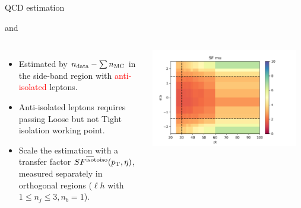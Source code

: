\begin{frame}{QCD estimation}
    

    \begin{block}{\cmh and \ceh}
    \begin{columns}[c]
    
        \begin{itemize}
            \item Estimated by $n_{\rm data} - \sum n_{\rm MC}$ in the side-band region with \textcolor{red}{anti-isolated} leptons.
            \item Anti-isolated leptons requires passing Loose but not Tight isolation working point.
            \item Scale the estimation with a transfer factor \textcolor{blue}{ $SF^{\rm \overline{iso} to iso} (p_{\mathrm{T}}, \eta)$}, measured separately in orthogonal regions ($\ell h$ with $1\leq n_j \leq3, n_b=1$).
        \end{itemize}
        
        \includegraphics[width=0.95\textwidth,trim=0 0 2cm 0, clip]{chapters/Analysis/sectionBackground/figures/ljets_kinematics/123j1b/SF_mu_2d.png}
        
    \end{columns}
    \end{block}
    
\end{frame}

    
    

    








